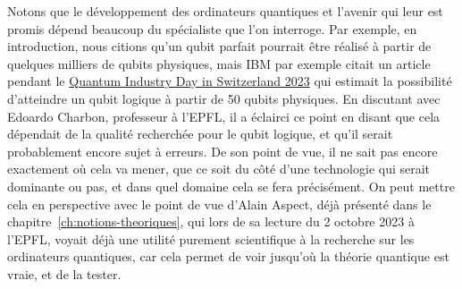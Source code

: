 Notons que le développement des ordinateurs quantiques et l'avenir qui leur est
promis dépend beaucoup du spécialiste que l'on interroge.
Par exemple, en introduction, nous citions qu'un qubit parfait pourrait être réalisé
à partir de quelques milliers de qubits physiques, mais IBM par exemple citait un article
pendant le \href{https://qidis23.b2match.io}{Quantum Industry Day in Switzerland 2023} qui
estimait la possibilité d'atteindre un qubit logique à partir de 50 qubits physiques.
En discutant avec Edoardo Charbon, professeur à l'EPFL, il a éclairci ce point en disant
que cela dépendait de la qualité recherchée pour le qubit logique, et qu'il serait probablement
encore sujet à erreurs.
De son point de vue, il ne sait pas encore exactement où cela va mener, que ce soit du côté d'une
technologie qui serait dominante ou pas, et dans quel domaine cela se fera précisément.
On peut mettre cela en perspective avec le point de vue d'Alain Aspect, déjà présenté
dans le chapitre~\ref{ch:notions-theoriques}, qui lors de sa lecture du 2 octobre 2023 à l'EPFL,
voyait déjà une utilité purement scientifique à la recherche sur les ordinateurs quantiques,
car cela permet de voir jusqu'où la théorie quantique est vraie, et de la tester.
